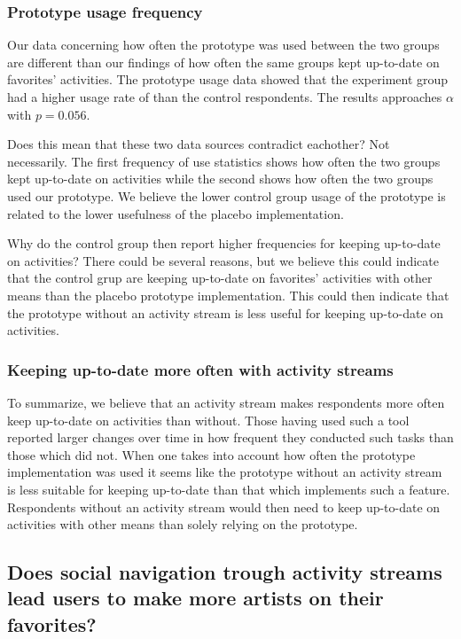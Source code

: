 \subsubsection{Prototype usage frequency}

Our data concerning how often the prototype was used between the two groups%
are different than our findings of how often the same groups kept up-to-date
on favorites' activities. The prototype usage data showed that the experiment
group had a higher usage rate of \latest{} than the control respondents. The
results approaches $\alpha$ with $p = 0.056$.

Does this mean that these two data sources contradict eachother? Not
necessarily. The first frequency of use statistics shows how often the two
groups kept up-to-date on activities while the second shows how often
the two groups used our prototype. We believe the lower control group usage of
the prototype is related to the lower usefulness of the placebo
implementation.

Why do the control group then report higher frequencies for keeping up-to-date
on activities? There could be several reasons, but we believe this could
indicate that the control grup are keeping up-to-date on favorites' activities
with other means than the placebo prototype implementation. This could then
indicate that the prototype without an activity stream is less useful
for keeping up-to-date on activities.

\subsubsection{Keeping up-to-date more often with activity streams}

To summarize, we believe that an activity stream makes respondents
more often keep up-to-date on activities than without. Those having used such
a tool reported larger changes over time in how frequent they conducted such
tasks than those which did not. When one takes into account how often the
prototype implementation was used it seems like the prototype without
an activity stream is less suitable for keeping up-to-date than that which
implements such a feature. Respondents without an activity stream would
then need to keep up-to-date on activities with other means than solely
relying on the prototype.

\subsection{%
  Does social navigation trough activity streams lead users to make
  more artists on \urort{} their favorites?
}

